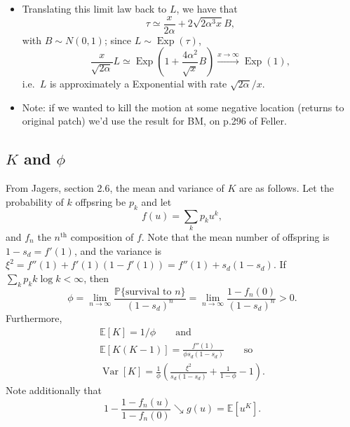 \documentclass{article}
\newcommand{\E}{\mathbb{E}}
\renewcommand{\P}{\mathbb{P}}
\newcommand{\var}{\mathop{\mbox{Var}}}
\newcommand{\Exp}{\mathop{\mbox{Exp}}}
\begin{document}
\begin{itemize}
\item Translating this limit law back to $L$, we have that
\[
  \tau \simeq \frac{x}{2\alpha} + 2\sqrt{2\alpha^3x} B,
\]
with $B \sim N(0,1)$; since $L \sim \Exp(\tau)$,
\[
  \frac{x}{\sqrt{2\alpha}} L \simeq \Exp\left(1+\frac{4\alpha^2}{\sqrt{x}}B\right) \xrightarrow{x\to\infty} \Exp(1),
\]
i.e.\ $L$ is approximately a Exponential with rate $\sqrt{2\alpha}/x$.

\item Note: if we wanted to kill the motion at some negative location (returns to original patch)
we'd use the result for BM, on p.296 of Feller.

\end{itemize}



\subsection{$K$ and $\phi$}

From Jagers, section 2.6,
the mean and variance of $K$ are as follows.
Let the probability of $k$ offpsring be $p_k$ and let
\[
 f(u) =  \sum_k p_k u^k,
\]
and $f_n$ the $n^\mathrm{th}$ composition of $f$.
Note that the mean number of offspring is $1-s_d = f'(1)$, and the variance is $\xi^2 = f''(1) + f'(1)(1-f'(1)) = f''(1) + s_d(1-s_d)$.
If $\sum_k p_k k \log k < \infty$, then 
\[
\phi = \lim_{n \to \infty} \frac{ \P\{ \mbox{survival to }n \}  }{ (1-s_d)^n } = \lim_{n \to \infty} \frac{ 1-f_n(0) }{ (1-s_d)^n } > 0 .
\]
Furthermore,
\begin{gather*}
\E[K] = 1/\phi \qquad \mbox{and} \\
\E[K(K-1)] = \frac{ f''(1) }{ \phi s_d (1-s_d) } \qquad \mbox{so} \\
\var[K] = \frac{1}{\phi} \left( \frac{ \xi^2 }{ s_d (1-s_d) } + \frac{1}{1-\phi} - 1 \right) .
\end{gather*}
Note additionally that 
\[
    1 - \frac{1-f_n(u)}{1-f_n(0)} \searrow g(u) = \E[u^K] .
\]
\end{document}
